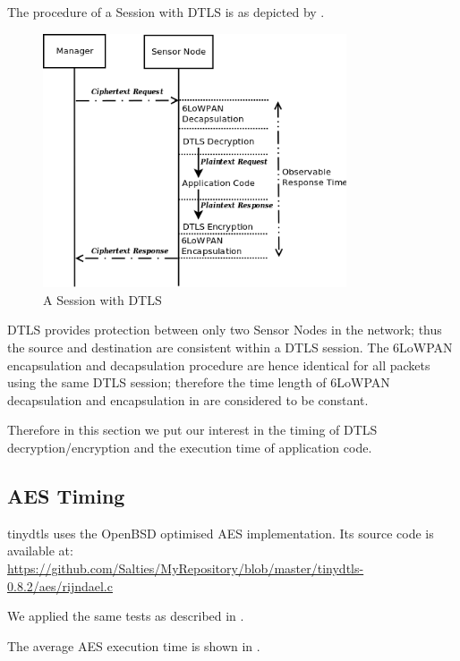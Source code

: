 The procedure of a Session with DTLS is as depicted by .

\begin{figure}[ht!]
	\center
	\includegraphics[width=0.8\textwidth]{fig/dtls_session.png}
	\caption{A Session with DTLS}
	\label{Fig: A Session with DTLS}
\end{figure}

DTLS provides protection between only two Sensor Nodes in the network; thus the source and destination are consistent within a DTLS session. The 6LoWPAN encapsulation and decapsulation procedure are hence identical for all packets using the same DTLS session; therefore the time length of 6LoWPAN decapsulation and encapsulation in  are considered to be constant.

Therefore in this section we put our interest in the timing of DTLS decryption/encryption and the execution time of application code.

\subsection{AES Timing} \label{tinydtls AES Timing}

tinydtls uses the OpenBSD optimised AES implementation. Its source code is available at:\\ 
\url{https://github.com/Salties/MyRepository/blob/master/tinydtls-0.8.2/aes/rijndael.c}

We applied the same tests as described in . 

The average AES execution time is shown in .

